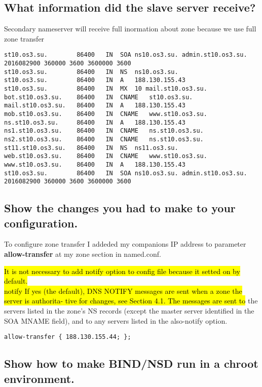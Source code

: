 \documentclass[a4paper,11pt]{article}
\begin{document}
\subsection{What information did the slave server receive?}
Secondary nameserver will receive full inormation about zone because we use full zone transfer

\begin{lstlisting}
st10.os3.su.        86400   IN  SOA ns10.os3.su. admin.st10.os3.su. 2016082900 360000 3600 3600000 3600
st10.os3.su.        86400   IN  NS  ns10.os3.su.
st10.os3.su.        86400   IN  A   188.130.155.43
st10.os3.su.        86400   IN  MX  10 mail.st10.os3.su.
bot.st10.os3.su.    86400   IN  CNAME   st10.os3.su.
mail.st10.os3.su.   86400   IN  A   188.130.155.43
mob.st10.os3.su.    86400   IN  CNAME   www.st10.os3.su.
ns.st10.os3.su.     86400   IN  A   188.130.155.43
ns1.st10.os3.su.    86400   IN  CNAME   ns.st10.os3.su.
ns2.st10.os3.su.    86400   IN  CNAME   ns.st10.os3.su.
st11.st10.os3.su.   86400   IN  NS  ns11.os3.su.
web.st10.os3.su.    86400   IN  CNAME   www.st10.os3.su.
www.st10.os3.su.    86400   IN  A   188.130.155.43
st10.os3.su.        86400   IN  SOA ns10.os3.su. admin.st10.os3.su. 2016082900 360000 3600 3600000 3600
\end{lstlisting}

\subsection{Show the changes you had to make to your configuration.}
To configure zone transfer I addeded my companions IP address to parameter \textbf{allow-transfer} at my zone section in named.conf.

\hl{It is not necessary to add notify option to config file because it setted on by default. \\}
\hl{notify If yes (the default), DNS NOTIFY messages are sent when a zone the }\hl{server is authorita- tive for changes, see Section 4.1. The messages are sent to }  the servers listed in the zone’s NS records (except the master server identified in the SOA MNAME field), and to any servers listed in the also-notify option.

\begin{lstlisting}
allow-transfer { 188.130.155.44; };
\end{lstlisting}

\subsection{Show how to make BIND/NSD run in a chroot environment.}
\end{document}
